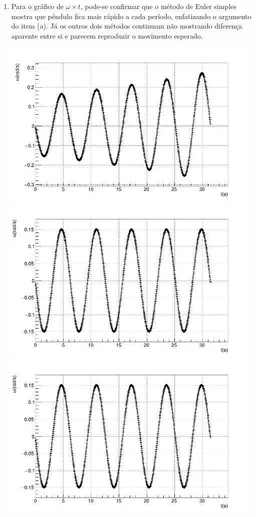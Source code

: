 \documentclass[main.tex]{subfiles}
\begin{document}
\begin{enumerate}[label=\textbf{\alph*)}]
\begin{center}
    \end{center}
    \item Para o gráfico de $\omega \times t$, pode-se confirmar que o método de Euler simples mostra que pêndulo fica mais rápido a cada período, enfatizando o argumento do item (a). Já os outros dois métodos continuam não mostrando diferença aparente entre si e parecem reproduzir o movimento esperado.
    \begin{center}
        \includegraphics[scale=0.15]{../q1/plots/omega_t_euler.png}
        \includegraphics[scale=0.15]{../q1/plots/omega_t_ec.png}
        \includegraphics[scale=0.15]{../q1/plots/omega_t_RK.png}

\end{center}
\end{enumerate}
\end{document}

